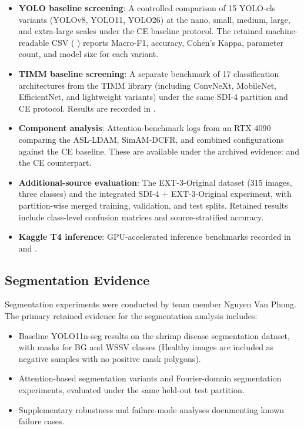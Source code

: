 \begin{itemize}
    \item \textbf{YOLO baseline screening}: A controlled comparison of 15 YOLO-cls variants (YOLOv8, YOLO11, YOLO26) at the nano, small, medium, large, and extra-large scales under the CE baseline protocol. The retained machine-readable CSV (%
) reports Macro-F1, accuracy, Cohen's Kappa, parameter count, and model size for each variant.
    \item \textbf{TIMM baseline screening}: A separate benchmark of 17 classification architectures from the TIMM library (including ConvNeXt, MobileNet, EfficientNet, and lightweight variants) under the same SDI-4 partition and CE protocol. Results are recorded in .
    \item \textbf{Component analysis}: Attention-benchmark logs from an RTX 4090 comparing the ASL-LDAM, SimAM-DCFR, and combined configurations against the CE baseline. These are available under the archived evidence:  and the CE counterpart.
    \item \textbf{Additional-source evaluation}: The EXT-3-Original dataset (315 images, three classes) and the integrated SDI-4 + EXT-3-Original experiment, with partition-wise merged training, validation, and test splits. Retained results include class-level confusion matrices and source-stratified accuracy.
    \item \textbf{Kaggle T4 inference}: GPU-accelerated inference benchmarks recorded in  and .
\end{itemize}

\subsection{Segmentation Evidence}
\label{sec:evidence-segmentation}

Segmentation experiments were conducted by team member Nguyen Van Phong. The primary retained evidence for the segmentation analysis includes:

\begin{itemize}
    \item Baseline YOLO11n-seg results on the shrimp disease segmentation dataset, with masks for BG and WSSV classes (Healthy images are included as negative samples with no positive mask polygons).
    \item Attention-based segmentation variants and Fourier-domain segmentation experiments, evaluated under the same held-out test partition.
    \item Supplementary robustness and failure-mode analyses documenting known failure cases.
\end{itemize}

